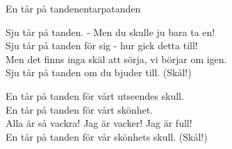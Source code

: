 \begin{song}{En tår på tanden}{entarpatanden}
\begin{vers}
\end{vers}
\begin{vers}

Sju tår på tanden. - Men du skulle ju bara ta en!\\
Sju tår på tanden för sig - hur gick detta till!\\
Men det finns inga skäl att sörja, vi börjar om igen.\\
Sju tår på tanden om du bjuder till. (Skål!)\\
\end{vers}
\begin{vers}
En tår på tanden för vårt utseendes skull.\\
En tår på tanden för vårt skönhet.\\
Alla är så vackra! Jag är vacker! Jag är full!\\
En tår på tanden för vår skönhets skull. (Skål!) \\
\end{vers}
\end{song}
